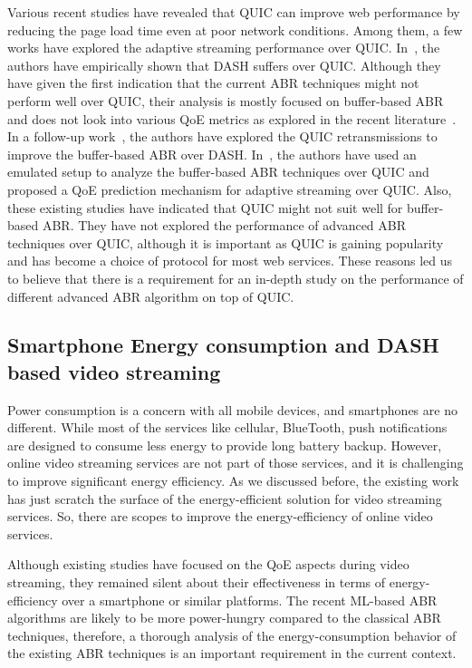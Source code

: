 Various recent studies \cite{Biswal2017,Megyesi2016,bhat2017not} have revealed that QUIC can improve web performance by reducing the page load time even at poor network conditions. Among them, a few works have explored the adaptive streaming performance over QUIC. In~\cite{bhat2017not}, the authors have empirically shown that DASH suffers over QUIC. Although they have given the first indication that the current ABR techniques might not perform well over QUIC, their analysis is mostly focused on buffer-based ABR and does not look into various QoE metrics as explored in the recent literature~\cite{yin2015control,mao2017neural}. In a follow-up work~\cite{bhat2018improving}, the authors have explored the QUIC retransmissions to improve the buffer-based ABR over DASH. In~\cite{van2018empirical}, the authors have used an emulated setup to analyze the buffer-based ABR techniques over QUIC and proposed a QoE prediction mechanism for adaptive streaming over QUIC. Also, these existing studies have indicated that QUIC might not suit well for buffer-based ABR. They have not explored the performance of advanced ABR techniques over QUIC, although it is important as QUIC is gaining popularity and has become a choice of protocol for most web services. These reasons led us to believe that there is a requirement for an in-depth study on the performance of different advanced ABR algorithm on top of QUIC.

\subsection{Smartphone Energy consumption and DASH based video streaming}
Power consumption is a concern with all mobile devices, and smartphones are no different. While most of the services like cellular, BlueTooth, push notifications are designed to consume less energy to provide long battery backup. However, online video streaming services are not part of those services, and it is challenging to improve significant energy efficiency. As we discussed before, the existing work has just scratch the surface of the energy-efficient solution for video streaming services. So, there are scopes to improve the energy-efficiency of online video services. 

Although existing studies have focused on the QoE aspects during video streaming, they remained silent about their effectiveness in terms of energy-efficiency over a smartphone or similar platforms. The recent ML-based ABR algorithms are likely to be more power-hungry compared to the classical ABR techniques, therefore, a thorough analysis of the energy-consumption behavior of the existing ABR techniques is an important requirement in the current context. 

